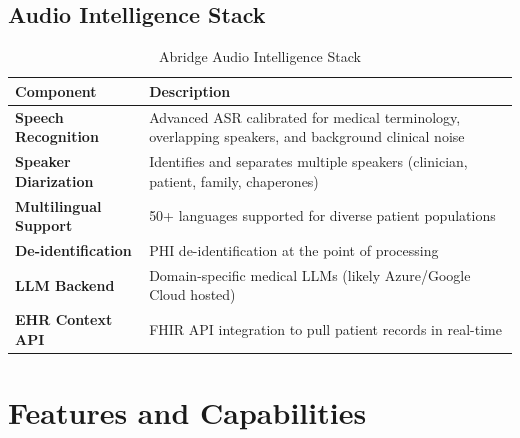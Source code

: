 \documentclass[12pt,a4paper]{article}
\begin{document}
\subsection{Audio Intelligence Stack}

\begin{table}[H]
\centering
\renewcommand{\arraystretch}{1.4}
\begin{tabularx}{\textwidth}{lX}
\toprule
\textbf{Component} & \textbf{Description} \\
\midrule
\textbf{Speech Recognition} & Advanced ASR calibrated for medical terminology, overlapping speakers, and background clinical noise \\
\textbf{Speaker Diarization} & Identifies and separates multiple speakers (clinician, patient, family, chaperones) \\
\textbf{Multilingual Support} & 50+ languages supported for diverse patient populations \\
\textbf{De-identification} & PHI de-identification at the point of processing \\
\textbf{LLM Backend} & Domain-specific medical LLMs (likely Azure/Google Cloud hosted) \\
\textbf{EHR Context API} & FHIR API integration to pull patient records in real-time \\
\bottomrule
\end{tabularx}
\caption{Abridge Audio Intelligence Stack}
\end{table}

\newpage

\section{Features and Capabilities}
\end{document}
